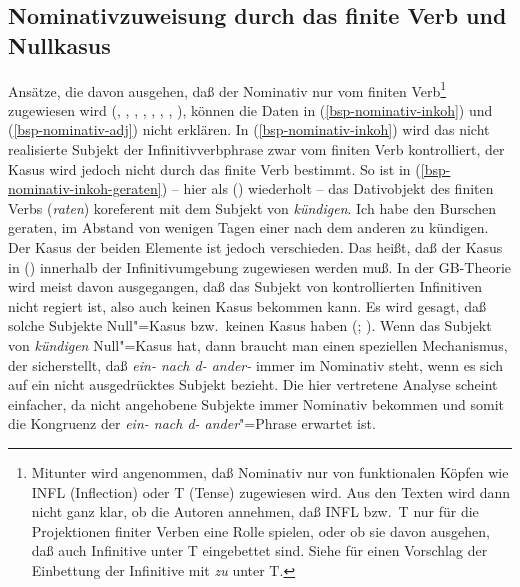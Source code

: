 \subsection{Nominativzuweisung durch das finite Verb und Nullkasus}
\label{sec-kasus-fin-verb-nullkasus}

Ansätze, die davon ausgehen, daß der Nominativ nur vom finiten Verb\footnote{
  Mitunter wird angenommen, daß Nominativ nur von funktionalen Köpfen wie INFL (Inflection) oder T (Tense) zugewiesen
  wird. Aus den Texten wird dann nicht ganz klar, ob die Autoren annehmen, daß INFL bzw.\ T nur für
  die Projektionen finiter Verben eine Rolle spielen, oder ob sie davon ausgehen, daß auch
  Infinitive unter T eingebettet sind. Siehe \citet[]{Wurmbrand2003a} für einen Vorschlag der Einbettung
  der Infinitive mit \emph{zu} unter T.%
} zugewiesen wird
%
(\citealp[]{Chomsky93a}, \citealp[]{Haider84b}, \citealp[]{FF87a},
\citealp[]{Bierwisch90a}, \citealp{Molnarfi98a},
\citealp*[]{BBM2001a}, \citealp[]{Eroms2000a}, \citealp[, , ]{Abraham2005a}), 
können die Daten in (\ref{bsp-nominativ-inkoh}) und (\ref{bsp-nominativ-adj}) nicht erklären.
In (\ref{bsp-nominativ-inkoh}) wird das nicht realisierte Subjekt der Infinitivverbphrase
zwar vom finiten Verb kontrolliert, der Kasus wird jedoch nicht durch das finite Verb
bestimmt. So ist \zb in (\ref{bsp-nominativ-inkoh-geraten}) -- hier als () wiederholt -- das Dativobjekt 
des finiten Verbs (\emph{raten}) koreferent mit dem Subjekt von \emph{kündigen}. 
\ea
Ich habe den Burschen geraten, im Abstand von wenigen Tagen einer nach dem anderen zu kündigen.
\z
Der Kasus der beiden Elemente ist jedoch verschieden. Das heißt, daß der Kasus in ()
innerhalb der Infinitivumgebung zugewiesen werden muß. In der GB-Theorie wird meist davon
ausgegangen, daß das Subjekt von kontrollierten Infinitiven nicht regiert ist, also auch
keinen Kasus bekommen kann. Es wird gesagt, daß solche Subjekte Null"=Kasus bzw.\ keinen Kasus
haben (\citealp[]{Grewendorf88a}; \citealp[]{Frey93a}).
Wenn das Subjekt von \emph{kündigen} Null"=Kasus hat,
dann braucht man einen speziellen Mechanismus, der sicherstellt,
daß \emph{ein- nach d- ander-} immer im Nominativ steht, wenn es sich auf ein nicht 
ausgedrücktes Subjekt bezieht. Die hier vertretene Analyse scheint einfacher,
da nicht angehobene Subjekte immer Nominativ bekommen und somit
die Kongruenz der \emph{ein- nach d- ander}"=Phrase erwartet ist.




